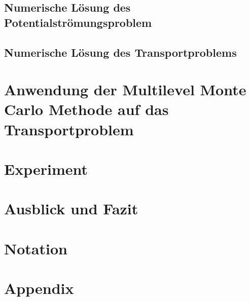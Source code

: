 \documentclass[12pt,a4paper]{scrartcl}
\theoremstyle{definition}
\numberwithin{equation}{section}
\begin{document}
\subsection{Numerische Lösung des Potentialströmungsproblem}

\newpage  %
\subsection{Numerische Lösung des Transportproblems}


\newpage  %
\section{Anwendung der Multilevel Monte Carlo Methode auf das Transportproblem}
\label{MLMCTP}

\newpage  %
\section{Experiment}


\newpage  %
\section{Ausblick und Fazit}
\newpage  %
\section{Notation}

\newpage  %
\section{Appendix}



  \newpage

  
  
 
\end{document}

